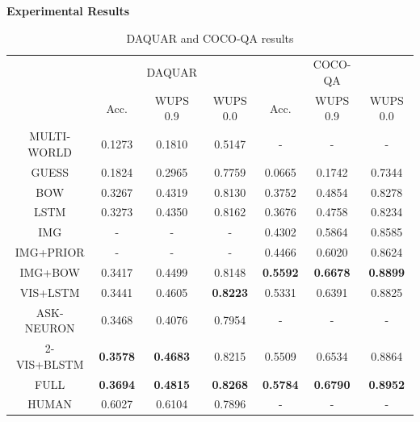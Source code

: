 \documentclass[serif,mathserif,final]{beamer}
\renewcommand{\*}[1]{\textbf{#1}}
\begin{document}
\begin{frame}{}
\begin{columns}[t]
\begin{column}{0.32\linewidth}
\begin{block}{\bf{\large Experimental Results}}
\begin{table}[t!]
\caption{DAQUAR and COCO-QA results}
\small
\label{tab:daquar_results}
\begin{center}
\begin{tabular}{c | c c c | c c c}
\hline
             &          &  DAQUAR  &          &          &  COCO-QA &          \\
             & Acc.     & WUPS 0.9 & WUPS 0.0 & Acc.     & WUPS 0.9 & WUPS 0.0 \\
\hline         
MULTI-WORLD \cite{mal14b}&  0.1273  &  0.1810  &  0.5147  &  -       &  -       &  -       \\
GUESS        &  0.1824  &  0.2965  &  0.7759  &  0.0665  &  0.1742  &  0.7344  \\
BOW          &  0.3267  &  0.4319  &  0.8130  &  0.3752  &  0.4854  &  0.8278  \\
LSTM         &  0.3273  &  0.4350  &  0.8162  &  0.3676  &  0.4758  &  0.8234  \\
IMG          &  -       &  -       &  -       &  0.4302  &  0.5864  &  0.8585  \\
IMG+PRIOR    &  -       &  -       &  -       &  0.4466  &  0.6020  &  0.8624  \\
IMG+BOW      &  0.3417  &  0.4499  &  0.8148  &\*{0.5592}&\*{0.6678}&\*{0.8899}\\
VIS+LSTM     &  0.3441  &  0.4605  &\*{0.8223}&  0.5331  &  0.6391  & 0.8825   \\
ASK-NEURON \cite{mal15}&  0.3468  &  0.4076  & 0.7954   &  -       &  -       &  -       \\
2-VIS+BLSTM  &\*{0.3578}&\*{0.4683}& 0.8215   &  0.5509  &  0.6534  & 0.8864   \\
FULL         &\*{0.3694}&\*{0.4815}&\*{0.8268}&\*{0.5784}&\*{0.6790}&\*{0.8952}\\
\hline
HUMAN        &  0.6027  &  0.6104  &  0.7896  &  -       &  -       &  -       \\
\hline
\end{tabular}
\end{center}
\end{table}
\vfill


\end{block}
\end{column}
\end{columns}
\end{frame}
\end{document}
